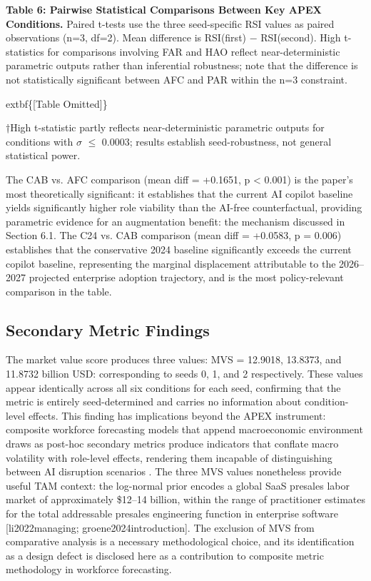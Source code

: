 \documentclass[10pt, conference]{IEEEtran}
\begin{document}
\textbf{Table 6: Pairwise Statistical Comparisons Between Key APEX Conditions.} Paired t-tests use the three seed-specific RSI values as paired observations (n=3, df=2). Mean difference is RSI(first) $-$ RSI(second). High t-statistics for comparisons involving FAR and HAO reflect near-deterministic parametric outputs rather than inferential robustness; note that the difference is not statistically significant between AFC and PAR within the n=3 constraint.

	extbf\{[Table Omitted]\}

†High t-statistic partly reflects near-deterministic parametric outputs for conditions with $\sigma$ $\leq$ 0.0003; results establish seed-robustness, not general statistical power.

The CAB vs. AFC comparison (mean diff = +0.1651, p < 0.001) is the paper's most theoretically significant: it establishes that the current AI copilot baseline yields significantly higher role viability than the AI-free counterfactual, providing parametric evidence for an augmentation benefit: the mechanism discussed in Section 6.1. The C24 vs. CAB comparison (mean diff = +0.0583, p = 0.006) establishes that the conservative 2024 baseline significantly exceeds the current copilot baseline, representing the marginal displacement attributable to the 2026--2027 projected enterprise adoption trajectory, and is the most policy-relevant comparison in the table.

\subsection{Secondary Metric Findings}

\label{sec:secondary_metric_findings}

The market value score produces three values: MVS = 12.9018, 13.8373, and 11.8732 billion USD: corresponding to seeds 0, 1, and 2 respectively. These values appear identically across all six conditions for each seed, confirming that the metric is entirely seed-determined and carries no information about condition-level effects. This finding has implications beyond the APEX instrument: composite workforce forecasting models that append macroeconomic environment draws as post-hoc secondary metrics produce indicators that conflate macro volatility with role-level effects, rendering them incapable of distinguishing between AI disruption scenarios \cite{virtanen2020scipy}. The three MVS values nonetheless provide useful TAM context: the log-normal prior encodes a global SaaS presales labor market of approximately \$12--14 billion, within the range of practitioner estimates for the total addressable presales engineering function in enterprise software [li2022managing; groene2024introduction]. The exclusion of MVS from comparative analysis is a necessary methodological choice, and its identification as a design defect is disclosed here as a contribution to composite metric methodology in workforce forecasting.
\end{document}
